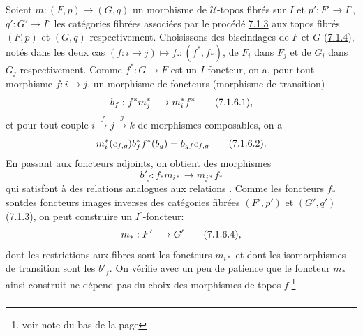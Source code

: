 \documentclass[10pt]{../fichiers-configuration-latex/smfart}
\begin{document}
Soient $m : (F, p) \to (G, q)$ un morphisme de $𝒰$-topos
fibrés sur $I$ et $p': F' \to I^{\circ}$, $q' : G'\to I^{\circ}$ les
catégories fibrées associées par le procédé \hyperref[VI.subsubsec7.1.3]{7.1.3}
aux topos fibrés $(F, p)$ et $(G, q)$ respectivement. Choisissons
des biscindages de $F$ et $G$ (\hyperref[VI.subsubsec7.1.4]{7.1.4}), notés dans
les deux cas $(f : i \to j) \mapsto f. : (f^{\ast}, f_{\ast})$, de
$F_i$ dans $F_j$ et de $G_i$ dans $G_j$ respectivement. Comme
$f^{\ast} : G \to F$ est un $I$-foncteur, on a, pour tout morphisme
$f : i \to j$, un morphisme de foncteurs (morphisme de transition)
\begin{equation*}
b_f : f^{\ast}m^{\ast}_j \to m^{\ast}_i f^{\ast}\tag{7.1.6.1}{\quoi},
\end{equation*}
et pour tout couple $i \xrightarrow{f} j \xrightarrow{g} k$ de
morphismes composables, on a
\begin{equation*}
m^{\ast}_i (c_{f, g}) b^{\ast}_f f^{\ast} (b_g) = b_{gf} c_{f, g}\tag{7.1.6.2}{}.
\end{equation*}
En passant aux foncteurs adjoints, on obtient des morphismes
\begin{equation*}
b'_f : f_{\ast}m_{i \ast} \to m_{j\ast} f_{\ast}\tag{7.1.6.3}
\end{equation*}
qui satisfont à des relations analogues aux relations . Comme
les foncteurs $f_{\ast}$ sont\pageoriginale des foncteurs images inverses des
catégories fibrées $(F', p')$ et $(G', q')$ (\hyperref[VI.subsubsec7.1.3]{7.1.3}), on peut
construire un $I^{\circ}$-foncteur:
\begin{equation*}
m_{\ast} : F'\to G'\tag{7.1.6.4}{\quoi},
\end{equation*}
dont les restrictions aux fibres sont les foncteurs $m_{i\ast}$ et
dont les isomorphismes de transition sont les $b'_f$. On vérifie
avec un peu de patience que le foncteur $m_{\ast}$ ainsi construit ne
dépend pas du choix des morphismes de topos $f$.\footnote{voir note du
  bas de la page }.

\subsubsection{}
\end{document}
